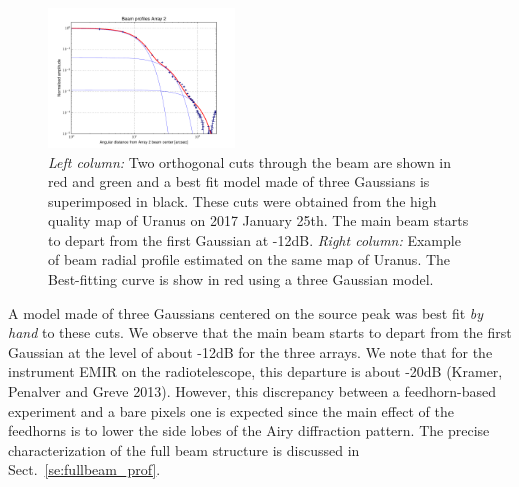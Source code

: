 \begin{figure}[ht!]
\begin{center}
    \includegraphics[clip=true, trim={-0.5cm, -0.65cm, 0, 0}, width=0.44\textwidth]{Figures/Beam_profiles_A2_FR.pdf}
    \caption[Beam structure]{\emph{Left column:} Two orthogonal cuts through the
      beam are shown in red and green and a best fit model made of three
      Gaussians is superimposed in black.
      These cuts were obtained from the high quality map of Uranus on 2017
      January 25th. The main beam starts to depart from the first Gaussian
      at -12dB. \emph{Right column:} Example of beam radial profile
      estimated on the same map of Uranus. The Best-fitting curve is show
      in red using a three Gaussian model.   
    }
    \label{fig:beam_structure_example}
  \end{center}
\end{figure}

A model made of three Gaussians centered on the source peak was best
fit {\it by hand} to these cuts.
We observe that the main beam starts to depart from the first
Gaussian at the level of about -12dB for the three arrays.
We note that for the instrument EMIR on the radiotelescope,
this departure is about -20dB (Kramer, Penalver and Greve
2013). However, this
discrepancy between a feedhorn-based experiment and a bare pixels one
is expected since the main effect of the feedhorns is to lower the
side lobes of the Airy diffraction pattern.
The precise characterization of the full beam structure is discussed
in Sect.~\ref{se:fullbeam_prof}.  



